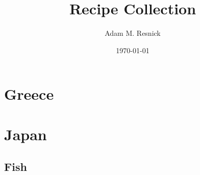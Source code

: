 \documentclass[11pt]{report}
\title{\bf{Recipe Collection}}
\author{Adam M. Resnick}
\date{\today}
\DeclareRobustCommand{\textfar}{\ensuremath{^{\circ}\mathrm{F}}}
\begin{document}
\maketitle

\tableofcontents

\begin{comment}
\begin{recipe}
[%
    preparationtime = {\unit[30]{min}},
    bakingtime={\unit[1]{h}},
    bakingtemperature={\protect\bakingtemperature{
        fanoven=\unit[230]{\textfar},
        topbottomheat=\unit[195]{°C},
        topheat=\unit[195]{°C},
        gasstove=Level 2}},
    portion = {\portion{5-6}},
    calory={\unit[3]{kJ}},
    source = {Somebody you used know}
]
{Test Recipe}

    \introduction{%
        \blindtext
    }

    \ingredients
    {%
        2 bar & Dark Chocolate (above \unit[70]{\%})\\
        3 & Eggs\\
        \unit[200]{ml} & Cream\\
        40 g & Sugar\\
        50 g & Butter
    }

    \preparation
    {%
        \step \blindtext
        \step \blindtext
        \step \blindtext
    }

    \suggestion[Headline]
    {%
        \blindtext
    }

    \suggestion{%
        \blindtext
    }

    \hint{%
        Enjoy typesetting recipes with {\textbf{\Large\LaTeX}} and {\textbf{\Large xcookybooky!}}
    }

\end{recipe}
\end{comment}

\chapter {Greece}

\chapter{Japan}
\section{Fish}
\end{document}
